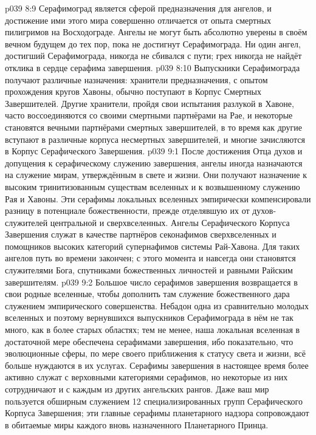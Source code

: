 \vs p039 8:9 \pc Серафимоград является сферой предназначения для ангелов, и достижение ими этого мира совершенно отличается от опыта смертных пилигримов на Восходограде. Ангелы не могут быть абсолютно уверены в своём вечном будущем до тех пор, пока не достигнут Серафимограда. Ни один ангел, достигший Серафимограда, никогда не сбивался с пути; грех никогда не найдёт отклика в сердце серафима завершения.
\vs p039 8:10 Выпускники Серафимограда получают различные назначения: хранители предназначения, с опытом прохождения кругов Хавоны, обычно поступают в Корпус Смертных Завершителей. Другие хранители, пройдя свои испытания разлукой в Хавоне, часто воссоединяются со своими смертными партнёрами на Рае, и некоторые становятся вечными партнёрами смертных завершителей, в то время как другие вступают в различные корпуса несмертных завершителей, и многие зачисляются в Корпус Серафического Завершения.
\vs p039 9:1 После достижения Отца духов и допущения к серафическому служению завершения, ангелы иногда назначаются на служение мирам, утверждённым в свете и жизни. Они получают назначение к высоким тринитизованным существам вселенных и к возвышенному служению Рая и Хавоны. Эти серафимы локальных вселенных эмпирически компенсировали разницу в потенциале божественности, прежде отделявшую их от духов\hyp{}служителей центральной и сверхвселенных. Ангелы Серафического Корпуса Завершения служат в качестве партнёров секонафимов сверхвселенных и помощников высоких категорий супернафимов системы Рай\hyp{}Хавона. Для таких ангелов путь во времени закончен; с этого момента и навсегда они становятся служителями Бога, спутниками божественных личностей и равными Райским завершителям.
\vs p039 9:2 Большое число серафимов завершения возвращается в свои родные вселенные, чтобы дополнить там служение божественного дара служением эмпирического совершенства. Небадон одна из сравнительно молодых вселенных и поэтому вернувшихся выпускников Серафимограда в нём не так много, как в более старых областях; тем не менее, наша локальная вселенная в достаточной мере обеспечена серафимами завершения, ибо показательно, что эволюционные сферы, по мере своего приближения к статусу света и жизни, всё больше нуждаются в их услугах. Серафимы завершения в настоящее время более активно служат с верховными категориями серафимов, но некоторые из них сотрудничают и с каждым из других ангельских рангов. Даже ваш мир пользуется обширным служением 12 специализированных групп Серафического Корпуса Завершения; эти главные серафимы планетарного надзора сопровождают в обитаемые миры каждого вновь назначенного Планетарного Принца.
